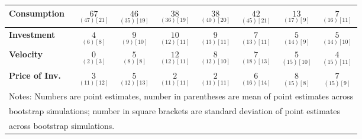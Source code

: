 \documentclass{article}
\begin{document}
\begin{tabular}{|l|c|@{}c|c|@{}c|c|@{}c|c|}
 \textbf{Consumption} & $\underset{( 47) [ 21]}{ 67}$ & $\underset{( 35) [ 19]}{ 46}$ & $\underset{( 36) [ 19]}{ 38}$ & $\underset{( 40) [ 20]}{ 38}$ & $\underset{( 45) [ 21]}{ 42}$ & $\underset{( 17) [  9]}{ 13}$ & $\underset{( 16) [ 11]}{  7}$ \\ \hline 
 \textbf{Investment} & $\underset{(  6) [  8]}{  4}$ & $\underset{(  9) [ 10]}{  9}$ & $\underset{( 12) [ 11]}{ 10}$ & $\underset{( 13) [ 11]}{  9}$ & $\underset{( 13) [ 11]}{  7}$ & $\underset{( 14) [  9]}{  5}$ & $\underset{( 14) [ 10]}{  5}$ \\ \hline 
 \textbf{Velocity} & $\underset{(  2) [  3]}{  0}$ & $\underset{(  8) [  8]}{  5}$ & $\underset{( 12) [ 11]}{ 12}$ & $\underset{( 12) [ 10]}{  8}$ & $\underset{( 18) [ 13]}{  7}$ & $\underset{( 15) [ 10]}{  5}$ & $\underset{( 15) [ 11]}{  4}$ \\ \hline 
 \textbf{Price of Inv.} & $\underset{( 11) [ 12]}{  3}$ & $\underset{( 12) [ 13]}{  5}$ & $\underset{( 11) [ 11]}{  2}$ & $\underset{( 11) [ 11]}{  2}$ & $\underset{( 16) [ 14]}{  6}$ & $\underset{( 15) [  8]}{  8}$ & $\underset{( 15) [  9]}{  7}$ \\ \hline 
 \multicolumn{8}{|l|}{Notes: Numbers are point estimates, number in 
 parentheses are mean of point estimates across} \\ \hline 
 \multicolumn{8}{|l|}{bootstrap simulations; number in square brackets are 
 standard deviation of point estimates} \\ \hline 
 \multicolumn{8}{|l|}{across bootstrap simulations.} \\ \hline 
 \end{tabular} 
\end{document}

